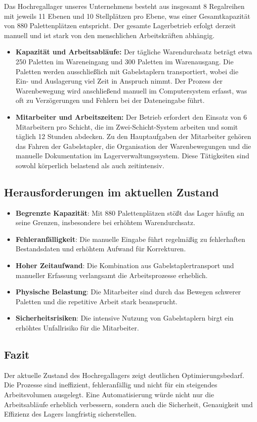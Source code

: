Das Hochregallager unseres Unternehmens besteht aus insgesamt 8 Regalreihen mit jeweils 11 Ebenen und 10 Stellplätzen pro Ebene, was einer Gesamtkapazität von 880 Palettenplätzen entspricht. Der gesamte Lagerbetrieb erfolgt derzeit manuell und ist stark von den menschlichen Arbeitskräften abhängig.
\begin{itemize}
	\item \textbf{Kapazität und Arbeitsabläufe:} 
	Der tägliche Warendurchsatz beträgt etwa 250 Paletten im Wareneingang und 300 Paletten im Warenausgang. Die Paletten werden ausschließlich mit Gabelstaplern transportiert, wobei die Ein- und Auslagerung viel Zeit in Anspruch nimmt. Der Prozess der Warenbewegung wird anschließend manuell im Computersystem erfasst, was oft zu Verzögerungen und Fehlern bei der Dateneingabe führt.
	
	\item \textbf{Mitarbeiter und Arbeitszeiten:}
	Der Betrieb erfordert den Einsatz von 6 Mitarbeitern pro Schicht, die im Zwei-Schicht-System arbeiten und somit täglich 12 Stunden abdecken. Zu den Hauptaufgaben der Mitarbeiter gehören das Fahren der Gabelstapler, die Organisation der Warenbewegungen und die manuelle Dokumentation im Lagerverwaltungssystem. Diese Tätigkeiten sind sowohl körperlich belastend als auch zeitintensiv.
\end{itemize}


\subsection*{Herausforderungen im aktuellen Zustand}

\begin{itemize}
	\item \textbf{Begrenzte Kapazität}: Mit 880 Palettenplätzen stößt das Lager häufig an seine Grenzen, insbesondere bei erhöhtem Warendurchsatz.
	\item \textbf{Fehleranfälligkeit}: Die manuelle Eingabe führt regelmäßig zu fehlerhaften Bestandsdaten und erhöhtem Aufwand für Korrekturen.
	\item \textbf{Hoher Zeitaufwand}: Die Kombination aus Gabelstaplertransport und manueller Erfassung verlangsamt die Arbeitsprozesse erheblich.
	\item \textbf{Physische Belastung}: Die Mitarbeiter sind durch das Bewegen schwerer Paletten und die repetitive Arbeit stark beansprucht.
	\item \textbf{Sicherheitsrisiken}: Die intensive Nutzung von Gabelstaplern birgt ein erhöhtes Unfallrisiko für die Mitarbeiter.
\end{itemize}

\subsection*{Fazit}

Der aktuelle Zustand des Hochregallagers zeigt deutlichen Optimierungsbedarf. Die Prozesse sind ineffizient, fehleranfällig und nicht für ein steigendes Arbeitsvolumen ausgelegt. Eine Automatisierung würde nicht nur die Arbeitsabläufe erheblich verbessern, sondern auch die Sicherheit, Genauigkeit und Effizienz des Lagers langfristig sicherstellen.